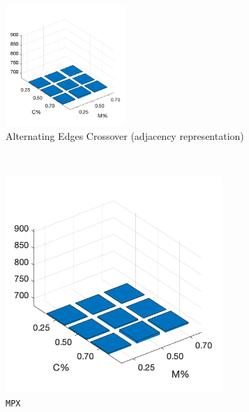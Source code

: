\begin{figure}
	\centering
%
	\begin{subfigure}[b]{0.7\textwidth}
		\centering
		\includegraphics[width=0.5\textwidth]{crossover/cross_unnamed_1.png}
		\caption{Alternating Edges Crossover (adjacency representation)}
		\label{fig:z}
    	\end{subfigure}\\
%
	\begin{subfigure}[b]{0.25\textwidth}
		\centering
		\includegraphics[width=0.9\textwidth]{crossover/cross_unnamed_1.png}
		\caption{\texttt{MPX}}
		\label{fig:x}
    	\end{subfigure}
%
	\begin{subfigure}[b]{0.25\textwidth}
		\centering

\end{subfigure}
\end{figure}

